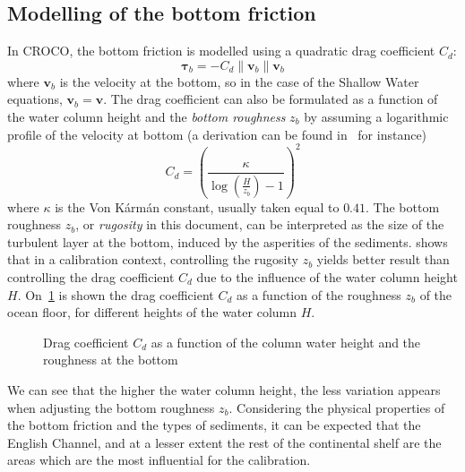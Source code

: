 \documentclass[../../Main_ManuscritThese.tex]{subfiles}
\newcommand{\CROCO}{CROCO}
\newcommand{\zob}{z_b}
\newcommand\imgpath{/home/victor/acadwriting/Manuscrit/Text/Chapter5/img/}
\begin{document}
\subsection{Modelling of the bottom friction}
\label{ssec:modelling_bottom}
In \CROCO, the bottom friction is modelled using a quadratic drag
coefficient $C_d$:
\begin{equation}
  \label{eq:bottom_stress_tau}
  \bm{\tau}_b= -C_d \|\mathbf{v}_b\|\mathbf{v}_b 
\end{equation}
where $\mathbf{v}_b$ is the velocity at the bottom, so in the case
of the Shallow Water equations, $\mathbf{v}_b = \mathbf{v}$.  The
drag coefficient can also be formulated as a function of the water
column height and the \emph{bottom roughness} $\zob$ by assuming a
logarithmic profile of the velocity at bottom (a derivation can be found in~\cite{le_bars_amandes_2010} for instance)
\begin{equation}
  \label{eq:quadratic_friction_vonkarman}
  C_d = \left(\frac{\kappa}{\log\left(\frac{H}{\zob}\right) - 1}\right)^2%
\end{equation}
where $\kappa$ is the Von K\'arm\'an constant, usually taken equal to
$0.41$.  The bottom roughness $\zob$, or \emph{rugosity} in this
document, can be interpreted as the size of the turbulent layer at the
bottom, induced by the asperities of the sediments.
\cite{boutet_estimation_2015} shows that in a calibration context,
controlling the rugosity $\zob$ yields better result than controlling
the drag coefficient $C_d$ due to the influence of the water column
height $H$.
On~\cref{fig:cd_zob} is shown the drag coefficient $C_d$ as a function
of the roughness $\zob$ of the ocean floor, for different heights of
the water column $H$.
\begin{figure}[ht]
  \centering 
  \caption[Drag coefficient $C_d$ as a function of the height and the
  roughness]{\label{fig:cd_zob} Drag coefficient $C_d$ as a function
    of the column water height and the roughness at the bottom}
\end{figure}


We can see that the higher the water column height, the less variation
appears when adjusting the bottom roughness $\zob$.  Considering the
physical properties of the bottom friction and the types of sediments,
it can be expected that the English Channel, and at a lesser extent
the rest of the continental shelf are the areas which are the most
influential for the calibration.
\end{document}
